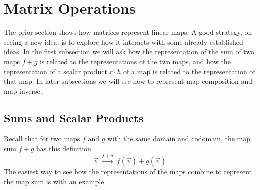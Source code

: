 \section{Matrix Operations}
The prior section shows how matrices represent linear maps.
A good strategy, on seeing a new idea, 
is to explore how it interacts with some already-established ideas.
In the first subsection we will ask how the representation of the 
sum of two maps $f+g$ is related to the representations of the two
maps, and
how the representation of a scalar product $r\cdot h$ of a map is related 
to the representation of that map.
In later subsections we will see how to represent 
map composition and map inverse.




\subsection{Sums and Scalar Products}
Recall that for two maps $f$ and $g$ with the same domain
and codomain, the map sum $f+g$ has this definition.
\begin{equation*}
  \vec{v} \;\stackrel{f+g}{\longmapsto}\; f(\vec{v})+g(\vec{v})
\end{equation*}
The easiest way to see how the representations of the maps
combine to represent the map sum is with an example.

